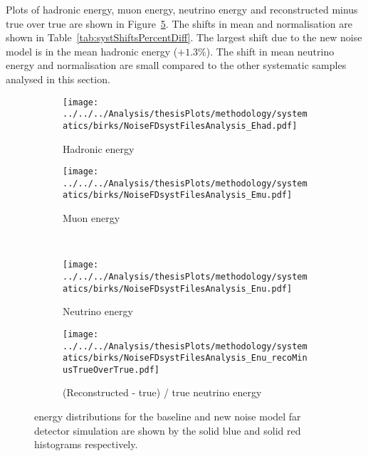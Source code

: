 Plots of hadronic energy, muon energy, neutrino energy and
reconstructed minus true over true are shown in
Figure~\ref{fig:systsFDNoise}. The shifts in mean and normalisation
are shown in Table~\ref{tab:systShiftsPercentDiff}. 
The largest shift due to the new noise model is in the mean hadronic
energy ($+1.3\%$). The shift in mean neutrino energy and normalisation
are small compared to the other systematic samples analysed in this
section.~\cite{LukeNoiseSystAna}


\begin{figure}%
  \begin{subfigure}{.5\textwidth}
    \centering
    \texttt{[image: ../../../Analysis/thesisPlots/methodology/systematics/birks/NoiseFDsystFilesAnalysis\_Ehad.pdf]}
    \caption{Hadronic energy}
    \label{fig:systsFDNoise_had}
  \end{subfigure}%
  \begin{subfigure}{.5\textwidth}
    \centering
    \texttt{[image: ../../../Analysis/thesisPlots/methodology/systematics/birks/NoiseFDsystFilesAnalysis\_Emu.pdf]}
    \caption{Muon energy }
    \label{fig:systsFDNoise_mu}
  \end{subfigure}\\
  \begin{subfigure}{.5\textwidth}
    \centering
    \texttt{[image: ../../../Analysis/thesisPlots/methodology/systematics/birks/NoiseFDsystFilesAnalysis\_Enu.pdf]}
    \caption{Neutrino energy}
    \label{fig:systsFDNoise_nu}
  \end{subfigure}%
  \begin{subfigure}{.5\textwidth}
    \centering
    \texttt{[image: ../../../Analysis/thesisPlots/methodology/systematics/birks/NoiseFDsystFilesAnalysis\_Enu\_recoMinusTrueOverTrue.pdf]}
    \caption{(Reconstructed  - true) / true neutrino energy }
    \label{fig:systsFDNoise_rmtot}
  \end{subfigure}
  \caption{
    energy distributions for the baseline and new noise model
    far detector simulation are shown by the solid blue and solid
    red histograms respectively. }
  \label{fig:systsFDNoise}
\end{figure}

